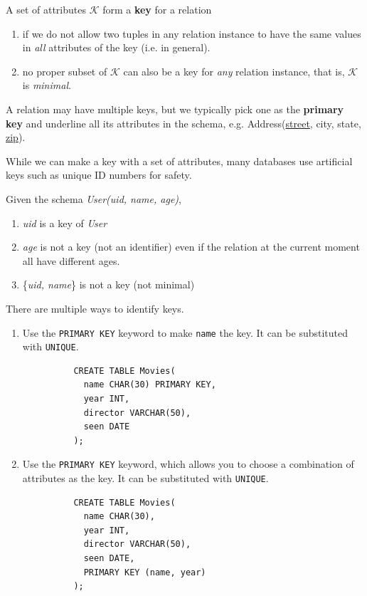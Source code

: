 \documentclass{article}
\begin{document}
    \begin{definition}[Key]
      A set of attributes $\mathcal{K}$ form a \textbf{key} for a relation 
      \begin{enumerate}
        \item if we do not allow two tuples in any relation instance to have the same values in \textit{all} attributes of the key (i.e. in general). 
        \item no proper subset of $\mathcal{K}$ can also be a key for \textit{any} relation instance, that is, $\mathcal{K}$ is \textit{minimal}. 
      \end{enumerate}
      A relation may have multiple keys, but we typically pick one as the \textbf{primary key} and underline all its attributes in the schema, e.g. Address(\underline{street}, city, state, \underline{zip}). 
    \end{definition}

    While we can make a key with a set of attributes, many databases use artificial keys such as unique ID numbers for safety. 

    \begin{example}
      Given the schema \textit{User(uid, name, age)}, 
      \begin{enumerate}
        \item \textit{uid} is a key of \textit{User} 
        \item \textit{age} is not a key (not an identifier) even if the relation at the current moment all have different ages. 
        \item \{\textit{uid, name}\} is not a key (not minimal)
      \end{enumerate}
    \end{example}


    \begin{theorem}
      There are multiple ways to identify keys. 
      \begin{enumerate}
        \item Use the \texttt{PRIMARY KEY} keyword to make \texttt{name} the key. It can be substituted with \texttt{UNIQUE}. 
        \begin{lstlisting}
          CREATE TABLE Movies(
            name CHAR(30) PRIMARY KEY,
            year INT, 
            director VARCHAR(50), 
            seen DATE
          ); 
        \end{lstlisting}

        \item Use the \texttt{PRIMARY KEY} keyword, which allows you to choose a combination of attributes as the key. It can be substituted with \texttt{UNIQUE}. 
        \begin{lstlisting}
          CREATE TABLE Movies(
            name CHAR(30),
            year INT, 
            director VARCHAR(50), 
            seen DATE, 
            PRIMARY KEY (name, year)
          ); 
        \end{lstlisting}
      \end{enumerate}
    \end{theorem}
\end{document}
